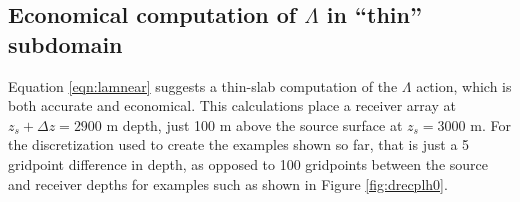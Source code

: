 



\subsection{Economical computation of $\Lambda$ in ``thin'' subdomain}
Equation \ref{eqn:lamnear} suggests a thin-slab computation of the
$\Lambda$ action, which is both accurate and economical. 
This calculations
place a receiver array at $z_s+\Delta z=2900$ m depth, just 100 m above the
source surface at $z_s=3000$ m. For the discretization used to create
the examples shown so far, that is just a 5 gridpoint difference in
depth, as opposed to 100 gridpoints between the source and receiver
depths for examples such as shown in Figure \ref{fig:drecplh0}.

